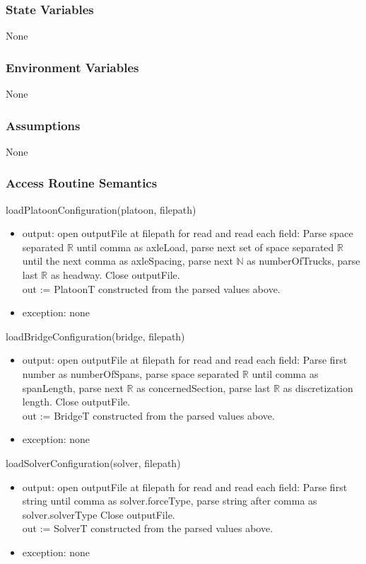 \documentclass[12pt, titlepage]{article}
\begin{document}
\subsubsection{State Variables}
None
\subsubsection{Environment Variables}
None
\subsubsection{Assumptions}
None
\subsubsection{Access Routine Semantics}

\noindent loadPlatoonConfiguration(platoon, filepath)
\begin{itemize}
\item output: open outputFile at filepath for read and read each field: 
Parse space separated $\mathbb{R}$ until comma as axleLoad, parse next set of space separated $\mathbb{R}$ until the next comma as axleSpacing, parse next $\mathbb{N}$ as numberOfTrucks, parse last $\mathbb{R}$ as headway.
Close outputFile.\\
out := PlatoonT constructed from the parsed values above.
\item exception: none
\end{itemize}

\noindent loadBridgeConfiguration(bridge, filepath)
\begin{itemize}
\item output: open outputFile at filepath for read and read each field: 
Parse first number as numberOfSpans, parse space separated $\mathbb{R}$ until comma as spanLength, parse next $\mathbb{R}$ as concernedSection, parse last $\mathbb{R}$ as discretization length.
Close outputFile.\\
out := BridgeT constructed from the parsed values above.
\item exception: none
\end{itemize}

\noindent loadSolverConfiguration(solver, filepath)
\begin{itemize}
\item output: open outputFile at filepath for read and read each field: 
Parse first string until comma as solver.forceType, parse string after comma as solver.solverType
Close outputFile.\\
out := SolverT constructed from the parsed values above.
\item exception: none
\end{itemize}
\end{document}
